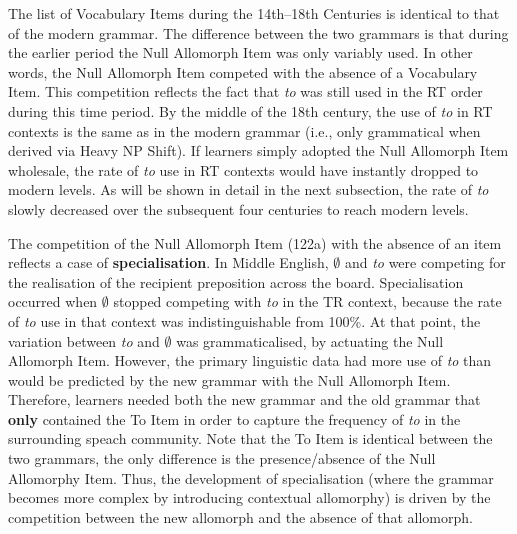 	The list of Vocabulary Items during the 14th--18th Centuries is identical to that of the modern grammar. The difference between the two grammars is that during the earlier period the Null Allomorph Item was only variably used. In other words, the Null Allomorph Item competed with the absence of a Vocabulary Item. This competition reflects the fact that \textit{to} was still used in the RT order during this time period. By the middle of the 18th century, the use of \textit{to} in RT contexts is the same as in the modern grammar (i.e., only grammatical when derived via Heavy NP Shift). If learners simply adopted the Null Allomorph Item wholesale, the rate of \textit{to} use in RT contexts would have instantly dropped to modern levels. As will be shown in detail in the next subsection, the rate of \textit{to} slowly decreased over the subsequent four centuries to reach modern levels.
	
	The competition of the Null Allomorph Item (122a) with the absence of an item reflects a case of \textbf{specialisation}. In Middle English, $\emptyset$ and \textit{to} were competing for the realisation of the recipient preposition across the board. Specialisation occurred when $\emptyset$ stopped competing with \textit{to} in the TR context, because the rate of \textit{to} use in that context was indistinguishable from 100\%. At that point, the variation between \textit{to} and $\emptyset$ was grammaticalised, by actuating the Null Allomorph Item. However, the primary linguistic data had more use of \textit{to} than would be predicted by the new grammar with the Null Allomorph Item. Therefore, learners needed both the new grammar and the old grammar that \textbf{only} contained the To Item in order to capture the frequency of \textit{to} in the surrounding speach community. Note that the To Item is identical between the two grammars, the only difference is the presence/absence of the Null Allomorphy Item. Thus, the development of specialisation (where the grammar becomes more complex by introducing contextual allomorphy) is driven by the competition between the new allomorph and the absence of that allomorph.


